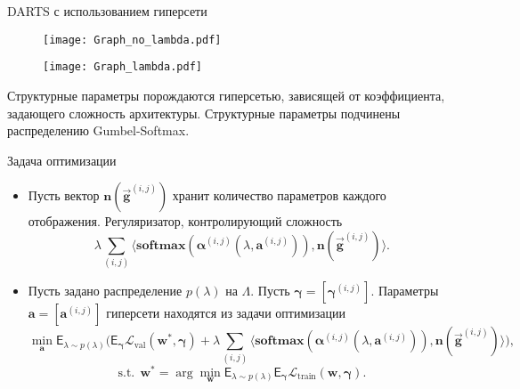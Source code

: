 \documentclass[aspectratio=169]{beamer}
\begin{document}
\begin{frame}{DARTS с использованием гиперсети}

\begin{figure}
\centering
\begin{minipage}{.5\textwidth}
  \centering
  \texttt{[image: Graph\_no\_lambda.pdf]}
\end{minipage}%
\begin{minipage}{.5\textwidth}
  \centering
  \texttt{[image: Graph\_lambda.pdf]}
\end{minipage}%
\end{figure}
 Структурные параметры порождаются гиперсетью, зависящей от коэффициента, задающего сложность архитектуры. Структурные параметры подчинены распределению Gumbel-Softmax.
\end{frame}







\begin{frame}{Задача оптимизации}
\begin{itemize}
\item Пусть вектор $\boldsymbol n(\vec{\boldsymbol g}^{(i, j)})$ хранит количество параметров каждого отображения. Регуляризатор, контролирующий сложность
\[
\lambda\sum_{(i, j)}\langle\boldsymbol{softmax}\left(\boldsymbol\alpha^{(i, j)}(\lambda, \boldsymbol{a}^{(i, j)})\right), \boldsymbol{n}(\vec{\boldsymbol g}^{(i, j)}) \rangle.
\]
\item Пусть задано распределение $p(\lambda)$ на $\Lambda$. Пусть $\boldsymbol\gamma = [\boldsymbol\gamma^{(i, j)}]$. Параметры $\boldsymbol{a} = [\boldsymbol a^{(i, j)}]$ гиперсети находятся из задачи оптимизации
\[
\min_{\boldsymbol{a}}\mathsf{E}_{\lambda \sim p(\lambda)}\bigg(\mathsf{E}_{\boldsymbol\gamma}\mathcal{L}_\text{val}(\boldsymbol w^*, \boldsymbol\gamma) + \lambda\sum_{(i, j)}\langle\boldsymbol{softmax}\left(\boldsymbol\alpha^{(i, j)}(\lambda, \boldsymbol{a}^{(i, j)})\right), \boldsymbol{n}(\vec{\boldsymbol g}^{(i, j)}) \rangle\bigg),
\]
\[
\mathrm{s.t.} ~~ \boldsymbol{w}^* = \arg\min_{\boldsymbol w}\mathsf{E}_{\lambda \sim p(\lambda)}\mathsf{E}_{\boldsymbol\gamma}\mathcal{L}_\text{train}(\boldsymbol w, \boldsymbol\gamma).
\]
\end{itemize}
\end{frame}
\end{document}
